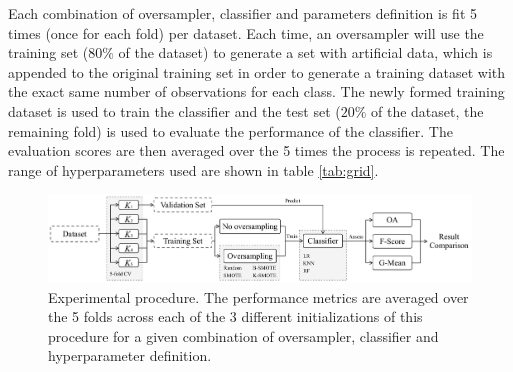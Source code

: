 \documentclass[remotesensing,article,submit,moreauthors,pdftex]{Definitions/mdpi}
\begin{document}
\begin{paracol}{2}
Each combination of oversampler, classifier and parameters definition is fit 5
times (once for each fold) per dataset. Each time, an oversampler will use the
training set ($80\%$ of the dataset) to generate a set with artificial data,
which is appended to the original training set in order to generate a training
dataset with the exact same number of observations for each class. The newly
formed training dataset is used to train the classifier and the test set ($20\%$
of the dataset, the remaining fold) is used to evaluate the performance of the
classifier. The evaluation scores are then averaged over the 5 times the process
is repeated. The range of hyperparameters used are shown in table
\ref{tab:grid}.

\end{paracol}
\begin{figure}
	\centering
	\includegraphics[width=1\linewidth]{../analysis/experiment_pipeline}
	\caption{Experimental procedure. The performance metrics are averaged over
    the 5 folds across each of the 3 different initializations of this procedure
    for a given combination of oversampler, classifier and hyperparameter
    definition.}
	\label{fig:experiment_pipeline}
\end{figure}
\begin{paracol}{2}
\linenumbers
\switchcolumn

\end{paracol}
\end{document}
